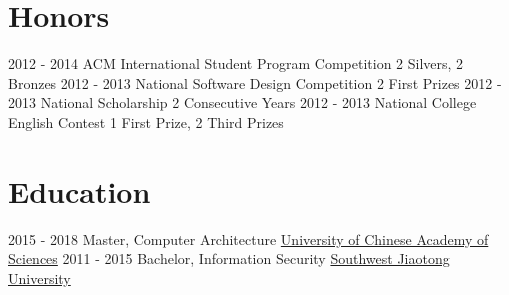 \documentclass[a4paper]{twentysecondcv} %
\begin{document}

\section{Honors}
\begin{twenty}
	\twentyitemthree
	{2012 - 2014}
	{ACM International Student Program Competition}
	{2 Silvers, 2 Bronzes}
	\twentyitemthree
	{2012 - 2013}
	{National Software Design Competition}
	{2 First Prizes}
	\twentyitemthree
	{2012 - 2013}
	{National Scholarship}
	{2 Consecutive Years}
	\twentyitemthree
	{2012 - 2013}
	{National College English Contest}
	{1 First Prize, 2 Third Prizes}
\end{twenty}


\section{Education}

\begin{twenty} %
	\twentyitemthree
	{2015 - 2018}
	{Master, Computer Architecture}
	{\href{http://english.cas.cn/}{University of Chinese Academy of Sciences}}
	\twentyitemthree
	{2011 - 2015}
	{Bachelor, Information Security}
	{\href{http://english.swjtu.edu.cn/}{Southwest Jiaotong University}}
\end{twenty}
\end{document}
